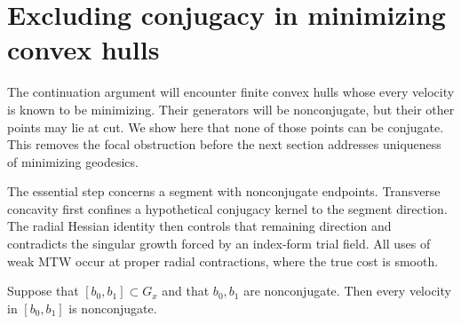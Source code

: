 \section{Excluding conjugacy in minimizing convex hulls}
\label{sec:conjugacy}

The continuation argument will encounter finite convex hulls whose every
velocity is known to be minimizing. Their generators will be nonconjugate,
but their other points may lie at cut. We show here that none of those
points can be conjugate. This removes the focal obstruction before the
next section addresses uniqueness of minimizing geodesics.

The essential step concerns a segment with nonconjugate endpoints.
Transverse concavity first confines a
hypothetical conjugacy kernel to the segment direction. The radial
Hessian identity then controls that remaining direction and contradicts
the singular growth forced by an index-form trial field. All uses of
weak MTW occur at proper radial contractions, where the true cost is
smooth.

\begin{proposition}
\label{prop:segment-nonconjugacy}
Suppose that $[b_0,b_1]\subset G_x$ and that $b_0,b_1$ are
nonconjugate.  Then every velocity in $[b_0,b_1]$ is nonconjugate.
\end{proposition}


